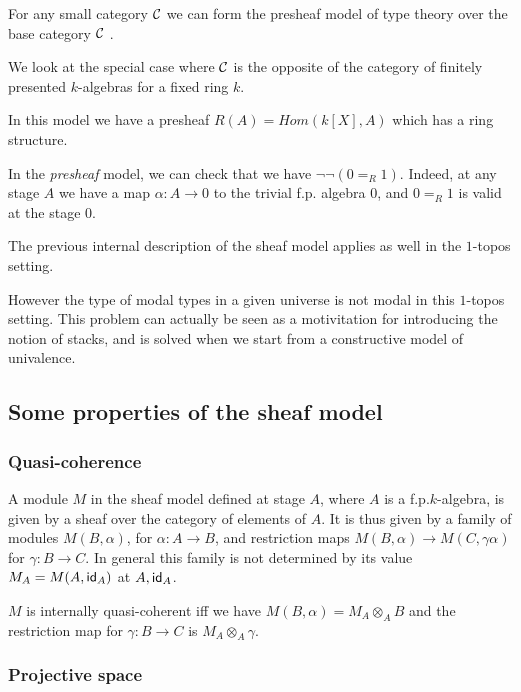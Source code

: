 For any small category $\mathcal{C}$ we can form the presheaf model of type theory over the base category $\mathcal{C}$ \cite{hofmann,huber-phd-thesis}.

\medskip

We look at the special case where $\mathcal{C}$ is the opposite of the category of finitely presented $k$-algebras for a fixed
ring $k$.

    In this model we have a presheaf $R(A) = Hom(k[X],A)$ which has a ring structure.

    In the {\em presheaf} model, we can check that we have $\neg\neg (0=_R 1)$. Indeed, at any stage $A$ we have
    a map $\alpha:A\rightarrow 0$ to the trivial f.p. algebra $0$, and $0 =_R 1$ is valid at the stage $0$.

    The previous internal description of the sheaf model applies as well in the $1$-topos setting.

    \medskip

    However the type of modal types in a given universe is not modal in this $1$-topos setting. This problem can actually be seen as a
    motivitation for introducing the notion of stacks, and is solved when we start from a constructive model of univalence.

    \subsection{Some properties of the sheaf model}

    \subsubsection{Quasi-coherence}

A module $M$ in the sheaf model defined at stage $A$, where $A$ is a f.p.\@ $k$-algebra, is given by a sheaf over the category
of elements of $A$. It is thus given by a family of modules $M(B,\alpha)$, for $\alpha:A\rightarrow B$, and restriction maps
$M(B,\alpha)\rightarrow M(C,\gamma\alpha)$ for $\gamma:B\rightarrow C$. In general this family is not determined by
its value $M_A = M(A,\mathsf{id}_A)$ at $A,\mathsf{id}_A$.

\begin{proposition}
  $M$ is internally quasi-coherent iff we have $M(B,\alpha) = M_A\otimes_A B$ and the restriction map for
  $\gamma:B\rightarrow C$ is $M_A\otimes_A\gamma$.
\end{proposition}

    \subsubsection{Projective space}


